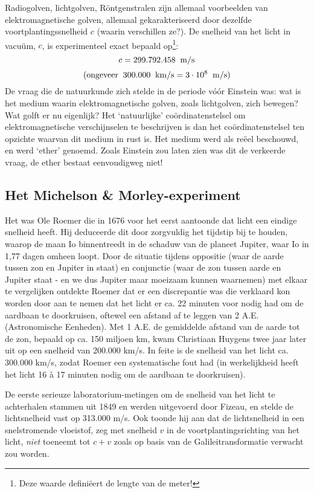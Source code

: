 Radiogolven, lichtgolven, R\"{o}ntgenstralen zijn allemaal voorbeelden van 
elektromagnetische golven, allemaal gekarakteriseerd door dezelfde 
voortplantingssnelheid $c$ (waarin verschillen ze?).
De snelheid van het licht in vacu\"um, $c$, is experimenteel exact bepaald op\footnote{Deze waarde defini\"eert de lengte van de meter!}:
\begin{displaymath}
c =  299.792.458  \;\; {\rm m/s} 
\end{displaymath}
\begin{displaymath}
{\rm (ongeveer} \;\; 300.000 \;\; {\rm km/s} = 3 \cdot 10^{8} \;\; {\rm m/s})
\end{displaymath}
De vraag die de natuurkunde zich stelde in de periode v\'{o}\'{o}r
Einstein was: wat is het medium waarin elektromagnetische
golven, zoals lichtgolven, zich bewegen?  Wat golft er nu eigenlijk? 
Het `natuurlijke' co\"{o}rdinatenstelsel om elektromagnetische
verschijnselen te beschrijven is dan het co\"{o}rdinatenstelsel ten
opzichte waarvan dit medium in rust is. Het medium werd als re\"eel
beschouwd, en werd `ether' genoemd.  Zoals Einstein zou laten zien was
dit de verkeerde vraag, de ether bestaat eenvoudigweg niet! 

\subsection{Het Michelson \& Morley-experiment}
Het was Ole Roemer die in 1676 voor het eerst aantoonde dat licht een
eindige snelheid heeft. Hij deduceerde dit door zorgvuldig het
tijdstip bij te houden, waarop de maan Io binnentreedt in de schaduw
van de planeet Jupiter, waar Io in 1,77 dagen omheen loopt.  Door de
situatie tijdens oppositie (waar de aarde tussen zon en Jupiter in
staat) en conjunctie (waar de zon tussen aarde en Jupiter staat - en
we dus Jupiter maar moeizaam kunnen waarnemen) met elkaar te
vergelijken ontdekte Roemer dat er een discrepantie was die verklaard
kon worden door aan te nemen dat het licht er ca. 22 minuten voor
nodig had om de aardbaan te doorkruisen, oftewel een afstand af te
leggen van 2 A.E. (Astronomische Eenheden). Met 1 A.E. de gemiddelde
afstand van de aarde tot de zon, bepaald op ca. 150 miljoen km, kwam
Christiaan Huygens twee jaar later uit op een snelheid van 200.000
km/s.  In feite is de snelheid van het licht ca. 300.000 km/s, zodat
Roemer een systematische fout had (in werkelijkheid heeft het licht 16
\`a 17 minuten nodig om de aardbaan te doorkruisen).  

De eerste serieuze laboratorium-metingen om de snelheid van het licht
te achterhalen stammen uit 1849 en werden uitgevoerd door Fizeau, en
stelde de lichtsnelheid vast op 313.000 m/s.  Ook toonde hij aan dat de
lichtsnelheid in een snelstromende vloeistof, zeg met snelheid $v$ in
de voortplantingsrichting van het licht, {\sl niet} toeneemt tot $c+v$ zoals
op basis van de Galileitransformatie verwacht zou worden.

